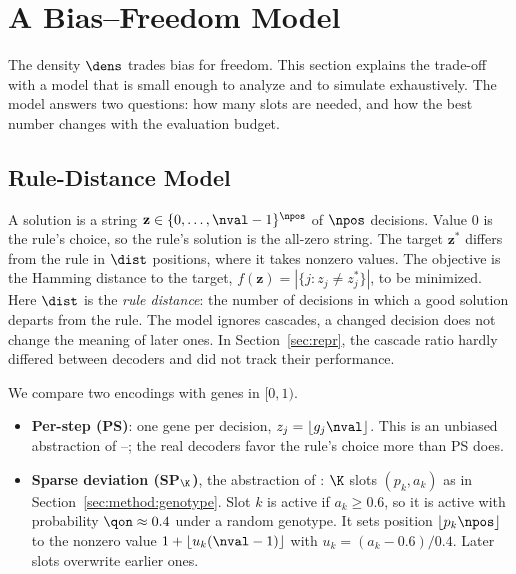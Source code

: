 \section{A Bias--Freedom Model}
\label{sec:theory}


The density $\dens$ trades bias for freedom.
This section explains the trade-off with a model that is small enough to analyze and to simulate exhaustively.
The model answers two questions: how many slots are needed, and how the best number changes with the evaluation budget.

\subsection{Rule-Distance Model}
\label{sec:theory:model}

A solution is a string $\mathbf{z} \in \{0, \dots, \nval-1\}^{\npos}$ of $\npos$ decisions.
Value $0$ is the rule's choice, so the rule's solution is the all-zero string.
The target $\mathbf{z}^\ast$ differs from the rule in $\dist$ positions, where it takes nonzero values.
The objective is the Hamming distance to the target, $f(\mathbf{z}) = |\{j : z_j \ne z^\ast_j\}|$, to be minimized.
Here $\dist$ is the \emph{rule distance}: the number of decisions in which a good solution departs from the rule.
The model ignores cascades, \ie a changed decision does not change the meaning of later ones.
In Section~\ref{sec:repr}, the cascade ratio hardly differed between decoders and did not track their performance.

We compare two encodings with genes in $[0,1)$.
\begin{itemize}
  \item \textbf{Per-step (PS)}: one gene per decision, $z_j = \lfloor g_j \nval \rfloor$.
  This is an unbiased abstraction of --; the real decoders favor the rule's choice more than PS does.
  \item \textbf{Sparse deviation (SP$_\K$)}, the abstraction of \SDD: $\K$ slots $(p_k, a_k)$ as in Section~\ref{sec:method:genotype}.
  Slot $k$ is active if $a_k \ge 0.6$, so it is active with probability $\qon \approx 0.4$ under a random genotype.
  It sets position $\lfloor p_k \npos \rfloor$ to the nonzero value $1 + \lfloor u_k (\nval-1) \rfloor$ with $u_k = (a_k-0.6)/0.4$.
  Later slots overwrite earlier ones.
\end{itemize}

